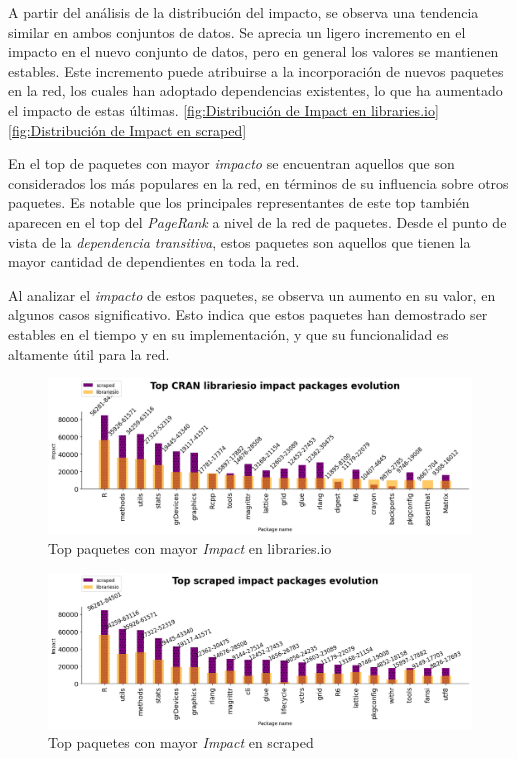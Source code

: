 A partir del análisis de la distribución del impacto, se observa una tendencia similar en ambos
conjuntos de datos. Se aprecia un ligero incremento en el impacto en el nuevo conjunto de datos,
pero en general los valores se mantienen estables. Este incremento puede atribuirse a la incorporación
de nuevos paquetes en la red, los cuales han adoptado dependencias existentes, lo que ha aumentado el
impacto de estas últimas. \ref{fig:Distribución de Impact en libraries.io} \ref{fig:Distribución de Impact en scraped}


En el top de paquetes con mayor \textit{impacto} se encuentran aquellos que son considerados los más populares
en la red, en términos de su influencia sobre otros paquetes. Es notable que los principales representantes
de este top también aparecen en el top del \textit{PageRank} a nivel de la red de paquetes. Desde el punto
de vista de la \textit{dependencia transitiva}, estos paquetes son aquellos que tienen la mayor cantidad de
dependientes en toda la red.

Al analizar el \textit{impacto} de estos paquetes, se observa un aumento en su valor, en algunos casos
significativo. Esto indica que estos paquetes han demostrado ser estables en el tiempo y en su implementación,
y que su funcionalidad es altamente útil para la red.

\begin{figure}[ht!]
    \begin{center}
        \includegraphics[width=1\textwidth]{img/cran/impact_top_libio.png}
        \caption{Top paquetes con mayor \textit{Impact} en libraries.io}
        \label{fig:Top impact libraries.io}
    \end{center}
\end{figure}

\begin{figure}[ht!]
    \begin{center}
        \includegraphics[width=1\textwidth]{img/cran/impact_top_scraped.png}
        \caption{Top paquetes con mayor \textit{Impact} en scraped}
        \label{fig:Top impact scraped}
    \end{center}
\end{figure}

